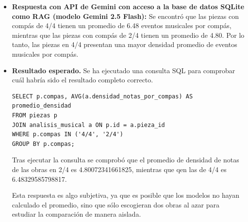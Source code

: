 \begin{itemize}
**Herramientas o lenguajes de programación que podrían ayudarte:**

*   **Python:** Puedes utilizar librerías como `music21` en Python para analizar la música y contar las notas por compás.
*   **Lenguajes de programación específicos:** Dependiendo del formato del dataset, es posible que debas utilizar lenguajes de programación más especializados para leer y procesar el archivo.

**Consideraciones adicionales:**

*   **Formato del dataset:** Asegúrate de entender cómo está estructurado tu dataset y qué información contiene.
*   **Definición de densidad de notas:** Considera si la densidad de notas es solo la cantidad de notas por compás o si también incluye otros factores, como ritmo o armonía.

Dado que no se proporcionó el dataset, esta es una posible forma general para abordar tu pregunta. Si necesitas un código específico o más detalles sobre cómo proceder con una herramienta particular, estaré encantado de ayudarte."
\item \textbf{Respuesta con API de Gemini con acceso a la base de datos SQLite como RAG (modelo Gemini 2.5 Flash):} Se encontró que las piezas con compás de 4/4 tienen un promedio de 6.48 eventos musicales por compás, mientras que las piezas con compás de 2/4 tienen un promedio de 4.80. Por lo tanto, las piezas en 4/4 presentan una mayor densidad promedio de eventos musicales por compás.
\item \textbf{Resultado esperado.} Se ha ejecutado una consulta SQL para comprobar cuál habría sido el resultado completo correcto.
    \begin{verbatim}
SELECT p.compas, AVG(a.densidad_notas_por_compas) AS promedio_densidad
FROM piezas p
JOIN analisis_musical a ON p.id = a.pieza_id
WHERE p.compas IN ('4/4', '2/4')
GROUP BY p.compas;
    \end{verbatim}    
    Tras ejecutar la consulta se comprobó que el promedio de densidad de notas de las obras en 2/4 es 4.80072341661825, mientras que qen las de 4/4 es 6.48329585798817.

    Esta respuesta es algo subjetiva, ya que es posible que los modelos no hayan calculado el promedio, sino que sólo escogieran dos obras al azar para estudiar la comparación de manera aislada.


\end{itemize}
